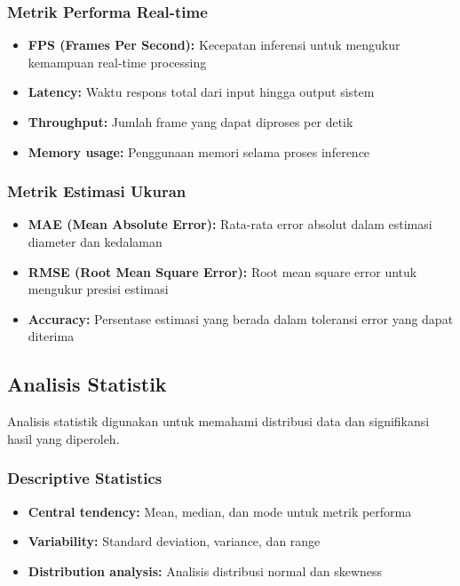 \documentclass[12pt,a4paper]{report}
\begin{document}
\subsubsection{Metrik Performa Real-time}

\begin{itemize}
    \item \textbf{FPS (Frames Per Second):} Kecepatan inferensi untuk mengukur kemampuan real-time processing
    \item \textbf{Latency:} Waktu respons total dari input hingga output sistem
    \item \textbf{Throughput:} Jumlah frame yang dapat diproses per detik
    \item \textbf{Memory usage:} Penggunaan memori selama proses inference
\end{itemize}

\subsubsection{Metrik Estimasi Ukuran}

\begin{itemize}
    \item \textbf{MAE (Mean Absolute Error):} Rata-rata error absolut dalam estimasi diameter dan kedalaman
    \item \textbf{RMSE (Root Mean Square Error):} Root mean square error untuk mengukur presisi estimasi
    \item \textbf{Accuracy:} Persentase estimasi yang berada dalam toleransi error yang dapat diterima
\end{itemize}

\subsection{Analisis Statistik}

Analisis statistik digunakan untuk memahami distribusi data dan signifikansi hasil yang diperoleh.

\subsubsection{Descriptive Statistics}

\begin{itemize}
    \item \textbf{Central tendency:} Mean, median, dan mode untuk metrik performa
    \item \textbf{Variability:} Standard deviation, variance, dan range
    \item \textbf{Distribution analysis:} Analisis distribusi normal dan skewness
\end{itemize}
\end{document}
